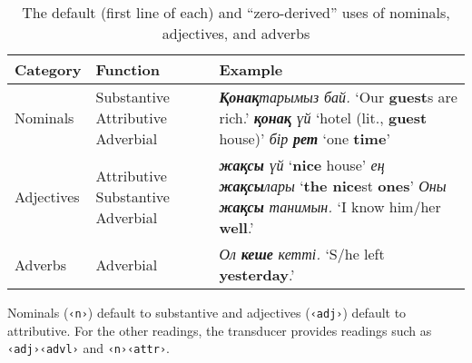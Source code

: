 \documentclass[a4paper,11pt, onecolumn,twoside]{article}
\newcommand{\kazakh}[1]{{\em #1}}
\newcommand{\gloss}[1]{`#1'}
\newcommand{\tag}[1]{\texttt{‹#1›}}
\begin{document}
\begin{table}[htbp]
	\centering
	\caption{The default (first line of each) and ``zero-derived'' uses of nominals, adjectives, and adverbs}\label{tab:zeroderiv}
	\begin{tabular}{lp{5em}p{20em}}
		\toprule
			\textbf{Category} & \textbf{Function} & \textbf{Example} \\
		\midrule
			Nominals & Substantive\newline
							Attributive\newline
							Adverbial
						& \kazakh{\textbf{Қонақ}тарымыз бай.} \gloss{Our \textbf{guest}s are rich.}\newline 
							\kazakh{\textbf{қонақ} үй} \gloss{hotel (lit., \textbf{guest} house)}\newline
							\kazakh{бір \textbf{рет}} \gloss{one \textbf{time}} \\\midrule
			Adjectives & Attributive\newline
							Substantive\newline
							Adverbial
						& \kazakh{\textbf{жақсы} үй} \gloss{\textbf{nice} house} \newline
						\kazakh{ең \textbf{жақсы}лары} \gloss{\textbf{the nice}st \textbf{ones}} \newline
						\kazakh{Оны \textbf{жақсы} танимын.} \gloss{I know him/her \textbf{well}.}
						\\\midrule
			Adverbs & Adverbial
						& \kazakh{Ол \textbf{кеше} кетті.} \gloss{S/he left \textbf{yesterday}.}
						\\
		\bottomrule
	\end{tabular}

\end{table}

Nominals (\tag{n}) default to substantive and adjectives (\tag{adj}) default to attributive.  For the other readings, the transducer provides readings such as \tag{adj}\tag{advl} and \tag{n}\tag{attr}.

\end{document}
